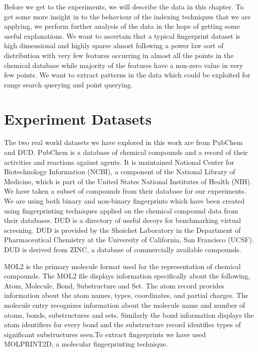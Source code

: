 Before we get to the experiments, we will describe the data in this chapter. To get some more insight in to the behaviour of the indexing techniques that we are applying, we perform further analysis of the data in the hope of getting some useful explanations. We want to ascertain that a typical fingerprint dataset is high dimensional and highly sparse almost following a power law sort of distribution with very few features occurring in almost all the points in the chemical database while majority of the features have a non-zero value in very few points. We want to extract patterns in the data which could be exploited for range search querying and point querying.\\

\section{Experiment Datasets}

The two real world datasets we have explored in this work are from PubChem and DUD. PubChem is a database of chemical compounds and a record of their activities and reactions against agents. It is maintained National Center for Biotechnology Information (NCBI), a component of the National Library of Medicine, which is part of the United States National Institutes of Health (NIH). We have taken a subset of compounds from their database for our experiments. We are using both binary and non-binary fingerprints which have been created using fingerprinting techniques applied on the chemical compound data from their databases. DUD is a directory of useful decoys for benchmarking virtual screening. DUD is provided by the Shoichet Laboratory in the Department of Pharmaceutical Chemistry at the University of California, San Francisco (UCSF). DUD is derived from ZINC, a database of commercially available compounds. 

MOL2 is the primary molecule format used for the representation of chemical compounds. The MOL2 file displays information specifically about the following, Atom, Molecule, Bond, Substructure and Set. The atom record provides information about the atom names, types, coordinates, and partial charges. The molecule entry recognizes information about the molecule name and number of atoms, bonds, substructures and sets. Similarly the bond information displays the atom identifiers for every bond and the substructure record identifies types of significant substructures seen.To extract fingerprints we have used MOLPRINT2D, a molecular fingerprinting technique.

